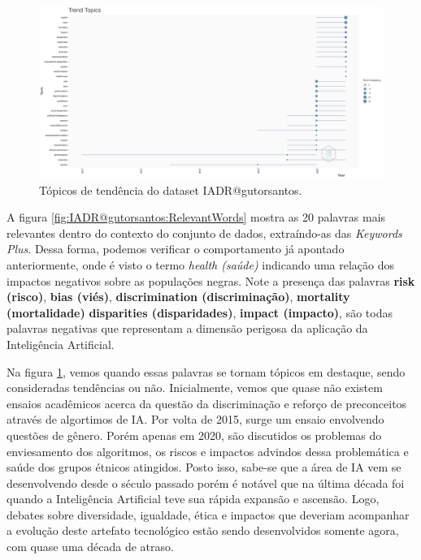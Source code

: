 \begin{figure}[H]
    \centering
\includegraphics[angle=0,width=1\textwidth]{experiments/gutorsantos/AnaliseBibliometrica/IAeDiscriminacao/imgs/TrendTopics-2022-02-09.png}
    \caption{Tópicos de tendência do dataset IADR@gutorsantos.}
    \label{fig:IADR@gutorsantos:TT}
\end{figure}

A figura \ref{fig:IADR@gutorsantos:RelevantWords} mostra as 20 palavras mais relevantes dentro do contexto do conjunto de dados, extraíndo-as das \textit{Keywords Plus}. Dessa forma, podemos verificar o comportamento já apontado anteriormente, onde é visto o termo \textit{health (saúde)} indicando uma relação dos impactos negativos sobre as populações negras. Note a presença das palavras \textbf{risk (risco)}, \textbf{bias (viés)}, \textbf{discrimination (discriminação)}, \textbf{mortality (mortalidade)} \textbf{disparities (disparidades)}, \textbf{impact (impacto)}, são todas palavras negativas que representam a dimensão perigosa da aplicação da Inteligência Artificial.

Na figura \ref{fig:IADR@gutorsantos:TT}, vemos quando essas palavras se tornam tópicos em destaque, sendo consideradas tendências ou não. Inicialmente, vemos que quase não existem ensaios acadêmicos acerca da questão da discriminação e reforço de preconceitos através de algortimos de IA. Por volta de 2015, surge um ensaio envolvendo questões de gênero. Porém apenas em 2020, são discutidos os problemas do enviesamento dos algoritmos, os riscos e impactos advindos dessa problemática e saúde dos grupos étnicos atingidos. Posto isso, sabe-se que a área de IA vem se desenvolvendo desde o século passado porém é notável que na última década foi quando a Inteligência Artificial teve sua rápida expansão e ascensão. Logo, debates sobre diversidade, igualdade, ética e impactos que deveriam acompanhar a evolução deste artefato tecnológico estão sendo desenvolvidos somente agora, com quase uma década de atraso. 


